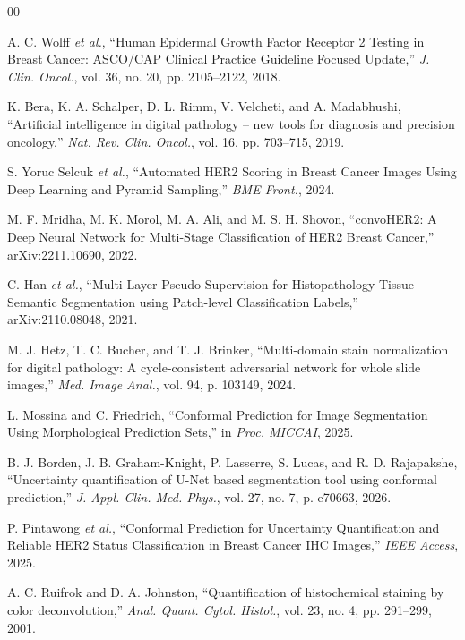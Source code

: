 \documentclass[conference]{IEEEtran}
\begin{document}
\begin{thebibliography}{00}

 A. C. Wolff \emph{et al.}, ``Human Epidermal Growth
Factor Receptor 2 Testing in Breast Cancer: ASCO/CAP Clinical Practice
Guideline Focused Update,'' \emph{J. Clin. Oncol.}, vol. 36, no. 20,
pp. 2105--2122, 2018.

 K. Bera, K. A. Schalper, D. L. Rimm, V. Velcheti, and
A. Madabhushi, ``Artificial intelligence in digital pathology -- new tools
for diagnosis and precision oncology,'' \emph{Nat. Rev. Clin. Oncol.},
vol. 16, pp. 703--715, 2019.

 S. Yoruc Selcuk \emph{et al.}, ``Automated HER2
Scoring in Breast Cancer Images Using Deep Learning and Pyramid Sampling,''
\emph{BME Front.}, 2024.

 M. F. Mridha, M. K. Morol, M. A. Ali, and M. S. H.
Shovon, ``convoHER2: A Deep Neural Network for Multi-Stage Classification
of HER2 Breast Cancer,'' arXiv:2211.10690, 2022.

 C. Han \emph{et al.}, ``Multi-Layer Pseudo-Supervision
for Histopathology Tissue Semantic Segmentation using Patch-level
Classification Labels,'' arXiv:2110.08048, 2021.

 M. J. Hetz, T. C. Bucher, and T. J. Brinker,
``Multi-domain stain normalization for digital pathology: A
cycle-consistent adversarial network for whole slide images,'' \emph{Med.
Image Anal.}, vol. 94, p. 103149, 2024.

 L. Mossina and C. Friedrich, ``Conformal Prediction
for Image Segmentation Using Morphological Prediction Sets,'' in
\emph{Proc. MICCAI}, 2025.

 B. J. Borden, J. B. Graham-Knight, P. Lasserre,
S. Lucas, and R. D. Rajapakshe, ``Uncertainty quantification of U-Net based
segmentation tool using conformal prediction,'' \emph{J. Appl. Clin. Med.
Phys.}, vol. 27, no. 7, p. e70663, 2026.

 P. Pintawong \emph{et al.}, ``Conformal Prediction
for Uncertainty Quantification and Reliable HER2 Status Classification in
Breast Cancer IHC Images,'' \emph{IEEE Access}, 2025.

 A. C. Ruifrok and D. A. Johnston, ``Quantification of
histochemical staining by color deconvolution,'' \emph{Anal. Quant. Cytol.
Histol.}, vol. 23, no. 4, pp. 291--299, 2001.


\end{thebibliography}
\end{document}
